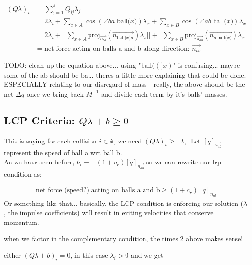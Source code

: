 \documentclass[12pt]{article}
\newcommand{\bigA}{{\mathbb{A}}}
\newcommand{\ball}[1]{\text{ball(} #1 \text{)}}
\newcommand{\proj}[2]{\text{proj}_{#1}(#2)}
\begin{document}
\begin{align*}
(Q \lambda)_i 
    &= \sum_{j = 1}^{\bigA} Q_{ij} \lambda_j\\
    &= 2\lambda_i + \sum_{x \in A}^{} \cos(\angle ba\;\ball{x})\lambda_x + \sum_{x \in B}^{} \cos(\angle ab\;\ball{x})\lambda_x\\
    &= 2\lambda_i
        + ||\sum_{x \in A}^{}\proj{\overrightarrow{n_{ba}}}{\overrightarrow{n_{\ball{x}a}}} \lambda_x||
        + ||\sum_{x \in B}^{}\proj{\overrightarrow{n_{ab}}}{\overrightarrow{n_{a\;\ball{x}}}} \lambda_x||\\
    &= \text{net force acting on balls a and b along direction: } \overrightarrow{n_{ab}}
\end{align*}


TODO: clean up the equation above... using "$\ball(x)$" is confusing... maybe some of the ab should be ba...
theres a little more explaining that could be done. ESPECIALLY relating to our disregard of mass - 
really, the above should be the net $\Delta \dot{q}$ once we bring back $M^{-1}$ and divide each
term by it's balls' masses.

\subsection*{LCP Criteria: $Q\lambda + b \geq 0$}

This is saying for each collision $i \in \bigA$, we need $(Q\lambda)_i \geq -b_i$.
Let $[\dot{q}]_{\overrightarrow{n_{ab}}}$ represent the speed of ball a wrt ball b.\\
As we have seen before, $b_i = -(1 + c_r) [\dot{q}]_{\overrightarrow{n_{ab}}}$
so we can rewrite our lcp condition as:

\begin{align*}
    \text{net force (speed?) acting on balls a and b} \geq (1 + c_r) [\dot{q}]_{\overrightarrow{n_{ab}}}
\end{align*}
\newline{}
Or something like that... basically, the LCP condition is enforcing our solution ($\lambda$,
the impulse coefficients) will result in exiting velocities that conserve momentum.


when we factor in the complementary condition, the times 2 above makes sense!

either $(Q\lambda + b)_i = 0$, in this case $\lambda_i > 0$ and we get
\end{document}
